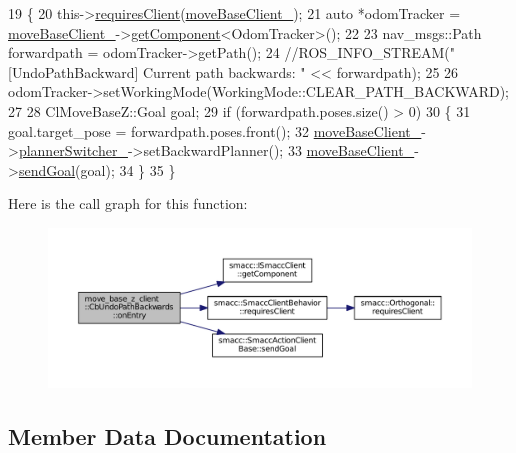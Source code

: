 \begin{DoxyCode}
19   \{
20     this->\hyperlink{classsmacc_1_1SmaccClientBehavior_a917f001e763a1059af337bf4e164f542}{requiresClient}(\hyperlink{classmove__base__z__client_1_1CbUndoPathBackwards_a19e7ace85698725a1d2730a7c6b3aa7d}{moveBaseClient\_});
21     \textcolor{keyword}{auto} *odomTracker = \hyperlink{classmove__base__z__client_1_1CbUndoPathBackwards_a19e7ace85698725a1d2730a7c6b3aa7d}{moveBaseClient\_}->\hyperlink{classsmacc_1_1ISmaccClient_adef78db601749ca63c19e74a27cb88cc}{getComponent}<OdomTracker>();
22 
23     nav\_msgs::Path forwardpath = odomTracker->getPath();
24     \textcolor{comment}{//ROS\_INFO\_STREAM("[UndoPathBackward] Current path backwards: " << forwardpath);}
25 
26     odomTracker->setWorkingMode(WorkingMode::CLEAR\_PATH\_BACKWARD);
27 
28     ClMoveBaseZ::Goal goal;
29     \textcolor{keywordflow}{if} (forwardpath.poses.size() > 0)
30     \{
31       goal.target\_pose = forwardpath.poses.front();
32       \hyperlink{classmove__base__z__client_1_1CbUndoPathBackwards_a19e7ace85698725a1d2730a7c6b3aa7d}{moveBaseClient\_}->\hyperlink{classmove__base__z__client_1_1ClMoveBaseZ_ac57d2293bc0a5c4fcef326379822cc5e}{plannerSwitcher\_}->setBackwardPlanner();
33       \hyperlink{classmove__base__z__client_1_1CbUndoPathBackwards_a19e7ace85698725a1d2730a7c6b3aa7d}{moveBaseClient\_}->\hyperlink{classsmacc_1_1SmaccActionClientBase_a58c67a87c5fb8ea1633573c58fe3eee1}{sendGoal}(goal);
34     \}
35   \}
\end{DoxyCode}


Here is the call graph for this function\+:
\nopagebreak
\begin{figure}[H]
\begin{center}
\leavevmode
\includegraphics[width=350pt]{classmove__base__z__client_1_1CbUndoPathBackwards_a171b0d1a2943f5aca0647b101695eb71_cgraph}
\end{center}
\end{figure}




\subsection{Member Data Documentation}
